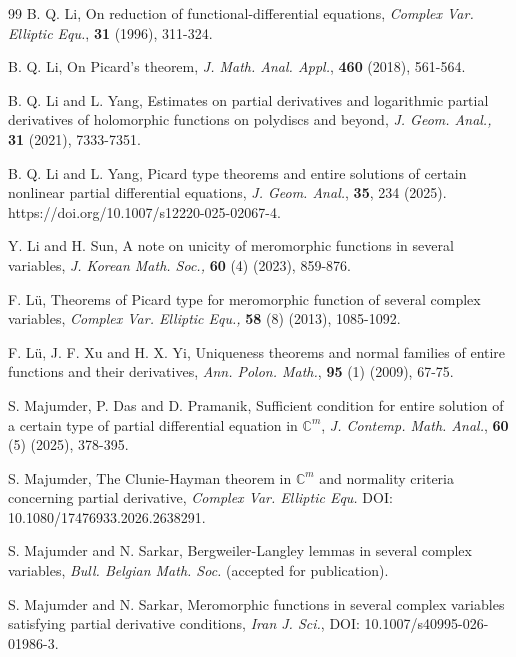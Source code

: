 \documentclass[11pt, reqno]{amsart}
\newtheorem*{cor A}{Corollary A}
\newtheorem*{cor B}{Corollary B}
\numberwithin{equation}{section}
\begin{document}
\begin{thebibliography}{99}
 {\sc B. Q. Li}, On reduction of functional-differential equations, \textit{Complex Var. Elliptic Equ.}, \textbf{31} (1996), 311-324.

 {\sc B. Q. Li}, On Picard's theorem, \textit{J. Math. Anal. Appl.}, \textbf{460} (2018), 561-564.

 {\sc B. Q. Li} and {\sc L. Yang}, Estimates on partial derivatives and logarithmic partial derivatives of holomorphic functions on polydiscs and beyond, \textit{J. Geom. Anal.,} \textbf{31} (2021), 7333-7351.

 {\sc B. Q. Li} and {\sc L. Yang}, Picard type theorems and entire solutions of certain nonlinear partial differential equations, \textit{J. Geom. Anal.}, \textbf{35}, 234 (2025). https://doi.org/10.1007/s12220-025-02067-4.

 {\sc Y. Li} and {\sc H. Sun}, A note on unicity of meromorphic functions in several variables, \textit{J. Korean Math. Soc.,} \textbf{60} (4) (2023), 859-876.

 {\sc F. L\"{u}}, Theorems of Picard type for meromorphic function of several complex variables, \textit{Complex Var. Elliptic Equ.,} \textbf{58} (8) (2013), 1085-1092.

 {\sc F. L\"{u}}, {\sc J. F. Xu} and {\sc H. X. Yi}, Uniqueness theorems and normal families of entire functions and their derivatives, \textit{Ann. Polon. Math.}, \textbf{95} (1) (2009), 67-75.

 {\sc S. Majumder}, {\sc P. Das} and {\sc D. Pramanik}, Sufficient condition for entire solution of a certain type of partial differential equation in $\mathbb{C}^m$, \textit{J. Contemp. Math. Anal.}, \textbf{60} (5) (2025), 378-395.

 {\sc S. Majumder}, The Clunie-Hayman theorem in $\mathbb{C}^m$ and normality criteria concerning partial derivative, \textit{Complex Var. Elliptic Equ.} DOI: 10.1080/17476933.2026.2638291.

 {\sc S. Majumder} and {\sc N. Sarkar}, Bergweiler-Langley lemmas in several complex variables, 
\textit{Bull. Belgian Math. Soc.} (accepted for publication).

 {\sc S. Majumder} and {\sc N. Sarkar}, Meromorphic functions in several complex variables
satisfying partial derivative conditions, \textit{Iran J. Sci.}, DOI: 10.1007/s40995-026-01986-3.


\end{thebibliography}
\end{document}
